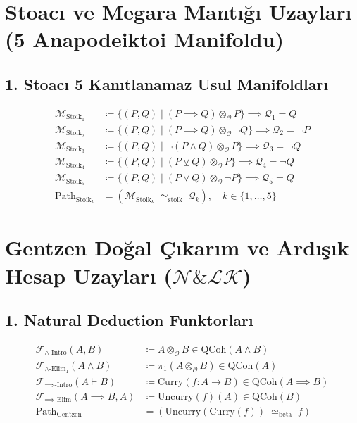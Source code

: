 \documentclass[11pt, a4paper]{article}
\begin{document}
\section{Stoacı ve Megara Mantığı Uzayları (5 Anapodeiktoi Manifoldu)}

\subsection{1. Stoacı 5 Kanıtlanamaz Usul Manifoldları}
\begin{align}
\mathcal{M}_{\text{Stoik}_1} &\coloneqq \{ (P, Q) \mid (P \implies Q) \otimes_{\mathcal{O}} P \} \implies \mathcal{Q}_1 = Q \\
\mathcal{M}_{\text{Stoik}_2} &\coloneqq \{ (P, Q) \mid (P \implies Q) \otimes_{\mathcal{O}} \neg Q \} \implies \mathcal{Q}_2 = \neg P \\
\mathcal{M}_{\text{Stoik}_3} &\coloneqq \{ (P, Q) \mid \neg(P \land Q) \otimes_{\mathcal{O}} P \} \implies \mathcal{Q}_3 = \neg Q \\
\mathcal{M}_{\text{Stoik}_4} &\coloneqq \{ (P, Q) \mid (P \veebar Q) \otimes_{\mathcal{O}} P \} \implies \mathcal{Q}_4 = \neg Q \\
\mathcal{M}_{\text{Stoik}_5} &\coloneqq \{ (P, Q) \mid (P \veebar Q) \otimes_{\mathcal{O}} \neg P \} \implies \mathcal{Q}_5 = Q \\
\text{Path}_{\text{Stoik}_k} &= (\mathcal{M}_{\text{Stoik}_k} \;\simeq_{\text{stoik}}\; \mathcal{Q}_k), \quad k \in \{1, \dots, 5\}
\end{align}

\section{Gentzen Doğal Çıkarım ve Ardışık Hesap Uzayları ($\mathcal{N} \& \mathcal{L}\mathcal{K}$)}

\subsection{1. Natural Deduction Funktorları}
\begin{align}
\mathcal{F}_{\land\text{-Intro}}(A, B) &\coloneqq A \otimes_{\mathcal{O}} B \in \text{QCoh}(A \land B) \\
\mathcal{F}_{\land\text{-Elim}_1}(A \land B) &\coloneqq \pi_1(A \otimes_{\mathcal{O}} B) \in \text{QCoh}(A) \\
\mathcal{F}_{\implies\text{-Intro}}(A \vdash B) &\coloneqq \text{Curry}(f : A \to B) \in \text{QCoh}(A \implies B) \\
\mathcal{F}_{\implies\text{-Elim}}(A \implies B, A) &\coloneqq \text{Uncurry}(f)(A) \in \text{QCoh}(B) \\
\text{Path}_{\text{Gentzen}} &= (\text{Uncurry}(\text{Curry}(f)) \;\simeq_{\text{beta}}\; f)
\end{align}
\end{document}
